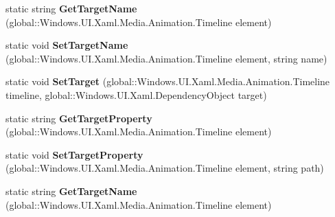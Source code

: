 \begin{DoxyCompactItemize}
\item 
\mbox{\label{class_windows_1_1_u_i_1_1_xaml_1_1_media_1_1_animation_1_1_storyboard_a4ad4c5f27f472132b6e4ec18554505e0}} 
static string {\bfseries Get\+Target\+Name} (global\+::\+Windows.\+U\+I.\+Xaml.\+Media.\+Animation.\+Timeline element)
\item 
\mbox{\label{class_windows_1_1_u_i_1_1_xaml_1_1_media_1_1_animation_1_1_storyboard_a50a435394c414f84722c631eb3ce3840}} 
static void {\bfseries Set\+Target\+Name} (global\+::\+Windows.\+U\+I.\+Xaml.\+Media.\+Animation.\+Timeline element, string name)
\item 
\mbox{\label{class_windows_1_1_u_i_1_1_xaml_1_1_media_1_1_animation_1_1_storyboard_a9a120900e03e5275519d4f240ae6671b}} 
static void {\bfseries Set\+Target} (global\+::\+Windows.\+U\+I.\+Xaml.\+Media.\+Animation.\+Timeline timeline, global\+::\+Windows.\+U\+I.\+Xaml.\+Dependency\+Object target)
\item 
\mbox{\label{class_windows_1_1_u_i_1_1_xaml_1_1_media_1_1_animation_1_1_storyboard_a992ba47ffd0cf9810bb90b1fefa1b861}} 
static string {\bfseries Get\+Target\+Property} (global\+::\+Windows.\+U\+I.\+Xaml.\+Media.\+Animation.\+Timeline element)
\item 
\mbox{\label{class_windows_1_1_u_i_1_1_xaml_1_1_media_1_1_animation_1_1_storyboard_ab3c2752dde5914726dbdb8671f80b4bf}} 
static void {\bfseries Set\+Target\+Property} (global\+::\+Windows.\+U\+I.\+Xaml.\+Media.\+Animation.\+Timeline element, string path)
\item 
\mbox{\label{class_windows_1_1_u_i_1_1_xaml_1_1_media_1_1_animation_1_1_storyboard_a4ad4c5f27f472132b6e4ec18554505e0}} 
static string {\bfseries Get\+Target\+Name} (global\+::\+Windows.\+U\+I.\+Xaml.\+Media.\+Animation.\+Timeline element)
\item 
\mbox{\label{class_windows_1_1_u_i_1_1_xaml_1_1_media_1_1_animation_1_1_storyboard_a50a435394c414f84722c631eb3ce3840}} 

\end{DoxyCompactItemize}
